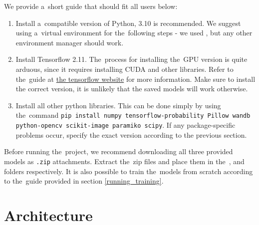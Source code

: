 We provide a~short guide that should fit all users below:

\begin{enumerate}
    \item Install a~compatible version of Python, 3.10 is recommended. We suggest using a~virtual environment for the~following steps - we used \cite{anaconda}, but any other environment manager should work.
    \item Install Tensorflow 2.11. The~process for installing the~GPU version is quite arduous, since it requires installing CUDA and other libraries. Refer to the~guide at \textcolor{red}{\href{https://www.tensorflow.org/install}{the tensorflow website}} for more information. Make sure to install the correct version, it is unlikely that the saved models will work otherwise.
    \item Install all other python libraries. This can be done simply by using the~command \texttt{pip install numpy tensorflow-probability Pillow wandb python-opencv scikit-image paramiko scipy}. If any package-specific problems occur, specify the exact version according to the previous section.
\end{enumerate}

Before running the~project, we recommend downloading all three provided models as \texttt{.zip} attachments. Extract the~zip files and place them in the~,  and  folders respectively. It is also possible to train the~models from scratch according to the~guide provided in section \textcolor{red}{\ref{running_training}}.


\section{Architecture}

